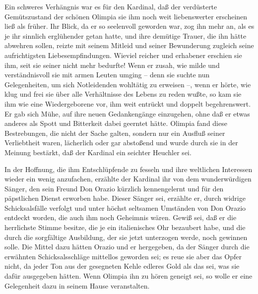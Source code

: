 Ein schweres Verhängnis war es für den Kardinal, daß der
verdüsterte Gemütszustand der schönen Olimpia sie ihm noch weit
liebenswerter erscheinen ließ als früher. Ihr Blick, da er so
seelenvoll geworden war, zog ihn mehr an, als es je ihr sinnlich
erglühender getan hatte, und ihre demütige Trauer, die ihn hätte
abwehren sollen, reizte mit seinem Mitleid und seiner Bewunderung
zugleich seine aufrichtigsten Liebesempfindungen. Wieviel reicher
und erhabener erschien sie ihm, seit sie seiner nicht mehr
bedurfte! Wenn er zusah, wie milde und verständnisvoll sie mit
armen Leuten umging – denn sie suchte nun Gelegenheiten, um sich
Notleidenden wohltätig zu erweisen –, wenn er hörte, wie klug und
frei sie über alle Verhältnisse des Lebens zu reden wußte, so kam
sie ihm wie eine Wiedergeborene vor, ihm weit entrückt und doppelt
begehrenswert. Er gab sich Mühe, auf ihre neuen Gedankengänge
einzugehen, ohne daß er etwas anderes als Spott und Bitterkeit
dabei\pagenum{[82]} geerntet hätte. Olimpia fand diese
Bestrebungen, die nicht der Sache galten, sondern nur ein Ausfluß
seiner Verliebtheit waren, lächerlich oder gar abstoßend und wurde
durch sie in der Meinung bestärkt, daß der Kardinal ein seichter
Heuchler sei.

In der Hoffnung, die ihm Entschlüpfende zu fesseln und ihre
weltlichen Interessen wieder ein wenig anzufachen, erzählte der
Kardinal ihr von dem wunderwürdigen Sänger, den sein Freund Don
Orazio kürzlich kennengelernt und für den päpstlichen Dienst
erworben habe. Dieser Sänger sei, erzählte er, durch widrige
Schicksalsfälle verfolgt und unter höchst seltsamen Umständen von
Don Orazio entdeckt worden, die auch ihm noch Geheimnis wären.
Gewiß sei, daß er die herrlichste Stimme besitze, die je ein
italienisches Ohr bezaubert habe, und die durch die sorgfältige
Ausbildung, der sie jetzt unterzogen werde, noch gewinnen solle.
Die Mittel dazu hätten Orazio und er hergegeben, da der Sänger
durch die erwähnten Schicksalsschläge mittellos geworden sei; es
reue sie aber das Opfer nicht, da jeder Ton aus der gesegneten
Kehle edleres Gold als das sei, was sie dafür ausgegeben hätten.
Wenn Olimpia ihn zu hören geneigt sei, so wolle er eine Gelegenheit
dazu in seinem Hause veranstalten.

